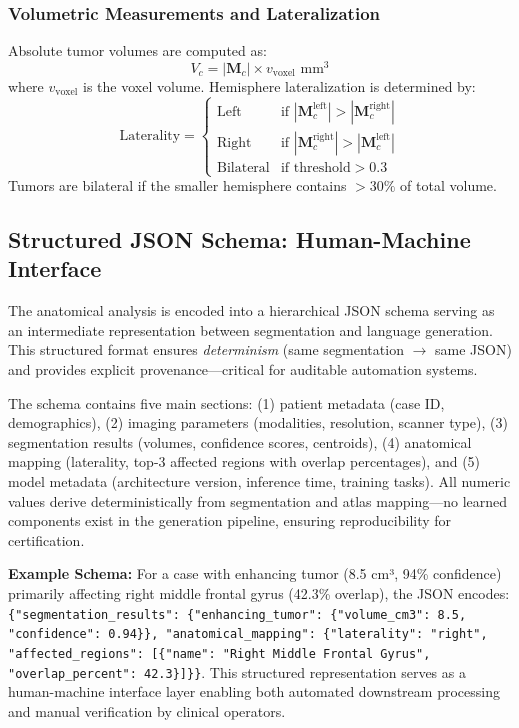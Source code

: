 \documentclass[conference]{IEEEtran}
\begin{document}
\subsubsection{Volumetric Measurements and Lateralization}
Absolute tumor volumes are computed as:
\begin{equation}
V_c = |\mathbf{M}_c| \times v_{\text{voxel}} \text{ mm}^3
\end{equation}
where $v_{\text{voxel}}$ is the voxel volume. Hemisphere lateralization is determined by:
\begin{equation}
\text{Laterality} = \begin{cases}
\text{Left} & \text{if } |\mathbf{M}_c^{\text{left}}| > |\mathbf{M}_c^{\text{right}}| \\
\text{Right} & \text{if } |\mathbf{M}_c^{\text{right}}| > |\mathbf{M}_c^{\text{left}}| \\
\text{Bilateral} & \text{if threshold} > 0.3
\end{cases}
\end{equation}
Tumors are bilateral if the smaller hemisphere contains $>30\%$ of total volume.

\subsection{Structured JSON Schema: Human-Machine Interface}

The anatomical analysis is encoded into a hierarchical JSON schema serving as an intermediate representation between segmentation and language generation. This structured format ensures \textit{determinism} (same segmentation $\to$ same JSON) and provides explicit provenance—critical for auditable automation systems.

The schema contains five main sections: (1) patient metadata (case ID, demographics), (2) imaging parameters (modalities, resolution, scanner type), (3) segmentation results (volumes, confidence scores, centroids), (4) anatomical mapping (laterality, top-3 affected regions with overlap percentages), and (5) model metadata (architecture version, inference time, training tasks). All numeric values derive deterministically from segmentation and atlas mapping—no learned components exist in the generation pipeline, ensuring reproducibility for certification.

\textbf{Example Schema:} For a case with enhancing tumor (8.5 cm³, 94\% confidence) primarily affecting right middle frontal gyrus (42.3\% overlap), the JSON encodes: \texttt{\{"segmentation\_results": \{"enhancing\_tumor": \{"volume\_cm3": 8.5, "confidence": 0.94\}\}, "anatomical\_mapping": \{"laterality": "right", "affected\_regions": [\{"name": "Right Middle Frontal Gyrus", "overlap\_percent": 42.3\}]\}\}}. This structured representation serves as a human-machine interface layer enabling both automated downstream processing and manual verification by clinical operators.
\end{document}
